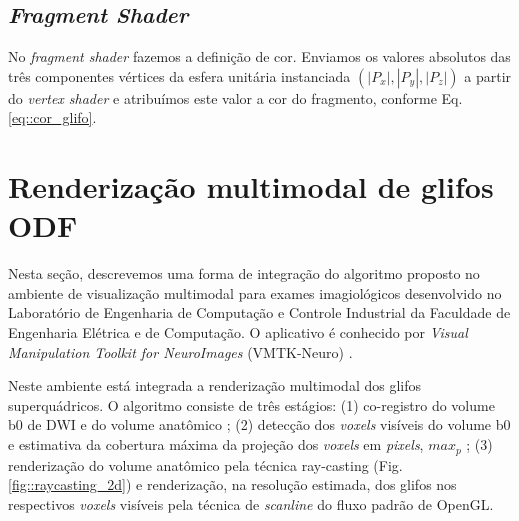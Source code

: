 
\subsection{\textit{Fragment Shader}}

No \textit{fragment shader} fazemos a definição de cor. Enviamos os valores absolutos das três componentes vértices da esfera unitária instanciada $(|P_x|, |P_y|, |P_z|)$ a partir do \textit{vertex shader} e atribuímos este valor a cor do fragmento, conforme Eq. \ref{eq::cor_glifo}.


\section{Renderização multimodal de glifos ODF}
\label{sec::superquadricas}

Nesta seção, descrevemos uma forma de integração do algoritmo proposto no 
ambiente de visualização multimodal para exames imagiológicos desenvolvido no Laboratório de Engenharia de Computação e Controle Industrial da Faculdade de Engenharia Elétrica e de Computação. O aplicativo é conhecido por \textit{Visual Manipulation Toolkit for NeuroImages} (VMTK-Neuro) \cite{VMTKNeuro}.

Neste ambiente está integrada a renderização multimodal dos glifos superquádricos. O algoritmo consiste de três estágios: (1) co-registro do volume b0 de DWI e do volume anatômico  \cite{ting2014}; (2) detecção dos \textit{voxels} visíveis do volume b0 e estimativa da cobertura máxima da projeção dos \textit{voxels} em \textit{pixels}, $max_p$ \cite{voltoline2021}; (3) renderização do volume anatômico pela técnica ray-casting (Fig. \ref{fig::raycasting_2d}) \cite{kruger2003} e renderização, na resolução estimada, dos glifos nos respectivos \textit{voxels} visíveis pela técnica de \textit{scanline} do fluxo padrão de OpenGL.

